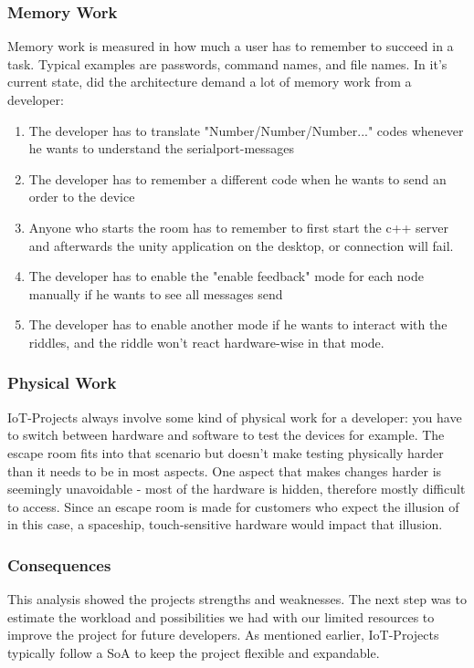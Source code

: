 \subsubsection{Memory Work}
Memory work is measured in how much a user has to remember to succeed in a task. 
Typical examples are passwords, command names, and file names.
In it's current state, did the architecture demand a lot of memory work from a developer:
\begin{enumerate}
    \item The developer has to translate "Number/Number/Number..." codes whenever he wants to understand the serialport-messages 
    \item The developer has to remember a different code when he wants to send an order to the device
    \item Anyone who starts the room has to remember to first start the c++ server and afterwards the unity application on the desktop, or connection will fail.
    \item The developer has to enable the "enable feedback" mode for each node manually if he wants to see all messages send
    \item The developer has to enable another mode if he wants to interact with the riddles, and the riddle won't react hardware-wise in that mode.
\end{enumerate} 

\subsubsection{Physical Work}
IoT-Projects always involve some kind of physical work for a developer: you have to switch between hardware and software to test the devices for example.
The escape room fits into that scenario but doesn't make testing physically harder than it needs to be in most aspects. 
One aspect that makes changes harder is seemingly unavoidable - most of the hardware is hidden, therefore mostly difficult to access. 
Since an escape room is made for customers who expect the illusion of in this case, a spaceship, 
touch-sensitive hardware would impact that illusion.

\subsubsection{Consequences}
This analysis showed the projects strengths and weaknesses. The next step was to estimate the workload and possibilities 
we had with our limited resources to improve the project for future developers. 
As mentioned earlier, IoT-Projects typically follow a SoA %
to keep the project flexible and expandable. 

